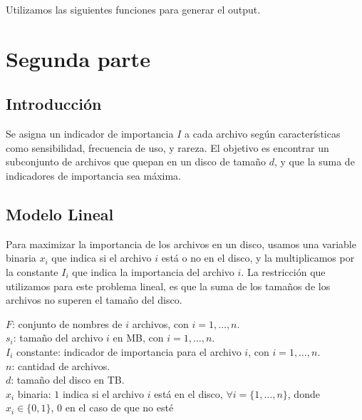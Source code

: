 \documentclass[11pt, a4paper, pdftex]{article}
\begin{document}


\newpage

Utilizamos las siguientes funciones para generar el output.



\newpage
\section{Segunda parte}

\subsection{Introducción}

Se asigna un indicador de importancia $I$ a cada archivo según
características como sensibilidad, frecuencia de uso, y rareza. El
objetivo es encontrar un subconjunto de archivos que quepan en un disco
de tamaño $d$, y que la suma de indicadores de importancia sea máxima.

\subsection{Modelo Lineal}

Para maximizar la importancia de los archivos en un disco, usamos una
variable binaria $x_i$ que indica si el archivo $i$ está o no en el
disco, y la multiplicamos por la constante $I_{i}$ que indica la
importancia del archivo $i$. La restricción que utilizamos para este
problema lineal, es que la suma de los tamaños de los archivos no superen
el tamaño del disco. 

$F$: conjunto de nombres de $i$ archivos, con $i = 1, \ldots, n$. \\

$s_{i}$: tamaño del archivo $i$ en MB, con $i = 1, \ldots, n$. \\

$I_i$ constante: indicador de importancia para el archivo $i$, con $i = 1, \ldots, n$. \\

$n$: cantidad de archivos. \\

$d$: tamaño del disco en TB. \\ 

$x_{i}$ binaria: $1$ indica si el archivo $i$ está en el disco, $\forall i = \{1, \ldots, n\}$, donde $x_{i} \in \{0, 1\}$, $0$ en el caso de que no esté\\
\end{document}
